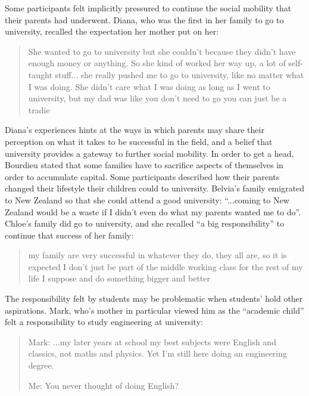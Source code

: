 Some participants felt implicitly pressured to continue the social mobility that their parents had underwent. Diana, who was the first in her family to go to university, recalled the expectation her mother put on her: \blockquote{She wanted to go to university but she couldn't because they didn't have enough money or anything. So she kind of worked her way up, a lot of self-taught stuff... she really pushed me to go to university, like no matter what I was doing. She didn't care what I was doing as long as I went to university, but my dad was like you don't need to go you can just be a tradie}. Diana's experiences hints at the ways in which parents may share their perception on what it takes to be successful in the field, and a belief that university provides a gateway to further social mobility. In order to get a head, Bourdieu stated that some families have to sacrifice aspects of themselves in order to accumulate capital. Some participants described how their parents changed their lifestyle their children could to university. Belvia's family emigrated to New Zealand so that she could attend a good university: ``...coming to New Zealand would be a waste if I didn't even do what my parents wanted me to do''. Chloe's family did go to university, and she recalled ``a big responsibility'' to continue that success of her family: \blockquote{my family are very successful in whatever they do, they all are, so it is expected I don't just be part of the middle working class for the rest of my life I suppose and do something bigger and better}. The responsibility felt by students may be problematic when students' hold other aspirations. Mark, who's mother in particular viewed him as the ``academic child'' felt a responsibility to study engineering at university: \blockquote{ 

Mark: ...my later years at school my best subjects were English and classics, not maths and physics. Yet I'm still here doing an engineering degree.

Me:	You never thought of doing English?

}
